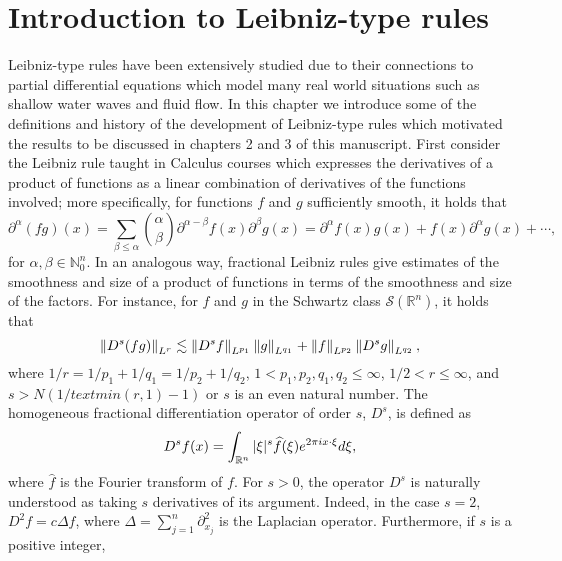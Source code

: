 
\cleardoublepage


\chapter{Introduction to Leibniz-type rules}
\label{makereference1}

Leibniz-type rules have been extensively studied due to their connections to partial differential equations which model many real world situations such as shallow water waves and fluid flow. In this chapter we introduce some of the definitions and history of the development of Leibniz-type rules which motivated the results to be discussed in chapters 2 and 3 of this manuscript. First consider the Leibniz rule taught in Calculus courses which expresses the derivatives of a product of functions as a linear combination of derivatives of the functions involved; more specifically, for functions $f$ and $g$ sufficiently smooth, it holds that
\[\partial^\alpha (fg)(x) = \sum_{\beta \leq \alpha} \binom{\alpha}{\beta} \partial^{\alpha - \beta} f(x) \partial^{\beta} g(x) = \partial^\alpha f(x) g(x) + f(x) \partial^\alpha g(x) + \cdots ,\]
for $\alpha,\beta \in \mathbb{N}^n_0$.
In an analogous way, fractional Leibniz rules give estimates of the smoothness and size of a product of functions in terms of the smoothness and size of the factors. For instance, for $f$ and $g$ in the Schwartz class $\mathcal{S}(\mathbb{R}^n)$, it holds that
\begin{equation}\label{def:leibniz}
\left\|D^s (fg)\right\|_{L^r} \lesssim \left\|D^s f\right\|_{L^{p_1}}\left\|g\right\|_{L^{q_1}} + \left\|f\right\|_{L^{p_2}}\left\|D^s g\right\|_{L^{q_2}},
\end{equation}
where $1/r = 1/p_1 + 1/q_1 = 1/p_2 + 1/q_2$, $1<p_1,p_2,q_1,q_2\leq \infty$, $1/2 <r\leq \infty$, and $s>N(1/text{min}(r,1) - 1)$ or $s$ is an even natural number. The homogeneous fractional differentiation operator of order $s$, $D^s$, is defined as \[D^s f(x) = \int_{{\mathbb R}^n} |\xi|^s \widehat{f}(\xi) e^{2\pi i x\cdot \xi} d\xi,\]
where $\widehat{f}$ is the Fourier transform of $f$.
For $s>0$, the operator $D^s$ is naturally understood as taking $s$ derivatives of its argument. Indeed, in the case $s=2$, $D^2f = c\Delta f$, where $\Delta = \sum_{j=1}^n \partial^2_{x_j}$ is the Laplacian operator. Furthermore, if $s$ is a positive integer,

